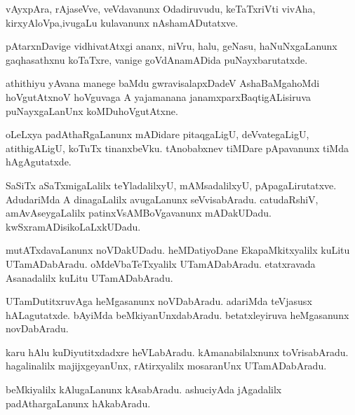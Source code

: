 \documentclass{article}
\begin{document}
\begin{mn}%
vAyxpAra, rAjaseVve, veVdavanunx Odadiruvudu, keTaTxriVti vivAha, kirxyAloVpa,ivugaLu 
kulavanunx nAshamADutatxve.
\end{mn}

\begin{mn}%
pAtarxnDavige vidhivatAtxgi ananx, niVru, halu, geNasu, haNuNxgaLanunx gaqhasathxnu 
koTaTxre, vanige goVdAnamADida puNayxbarutatxde.
\end{mn}

\begin{mn}%
athithiyu yAvana manege baMdu gwravisalapxDadeV AshaBaMgahoMdi hoVgutAtxnoV hoVguvaga A 
yajamanana janamxparxBaqtigALisiruva puNayxgaLanUnx koMDuhoVgutAtxne.
\end{mn}

\begin{mn}%
oLeLxya padAthaRgaLanunx mADidare pitaqgaLigU, deVvategaLigU, atithigALigU, koTuTx 
tinanxbeVku. tAnobabxnev tiMDare pApavanunx tiMda hAgAgutatxde.
\end{mn}

\begin{mn}%
SaSiTx aSaTxmigaLalilx teYladalilxyU, mAMsadalilxyU, pApagaLirutatxve. AdudariMda A 
dinagaLalilx avugaLanunx seVvisabAradu. catudaRshiV, amAvAseygaLalilx 
patinxVsAMBoVgavanunx mADakUDadu. kwSxramADisikoLaLxkUDadu.
\end{mn}

\begin{mn}%
mutATxdavaLanunx noVDakUDadu. heMDatiyoDane EkapaMkitxyalilx kuLitu UTamADabAradu. 
oMdeVbaTeTxyalilx UTamADabAradu. etatxravada Asanadalilx kuLitu UTamADabAradu.
\end{mn}

\begin{mn}%
UTamDutitxruvAga heMgasanunx noVDabAradu. adariMda teVjasusx hALagutatxde. bAyiMda 
beMkiyanUnxdabAradu. betatxleyiruva heMgasanunx novDabAradu.
\end{mn}

\begin{mn}%
karu hAlu kuDiyutitxdadxre heVLabAradu. kAmanabilalxnunx toVrisabAradu. hagalinalilx 
majijxgeyanUnx, rAtirxyalilx mosaranUnx UTamADabAradu.
\end{mn}

\begin{mn}%
beMkiyalilx kAlugaLanunx kAsabAradu. ashuciyAda jAgadalilx padAthargaLanunx hAkabAradu.
\end{mn}
\end{document}
